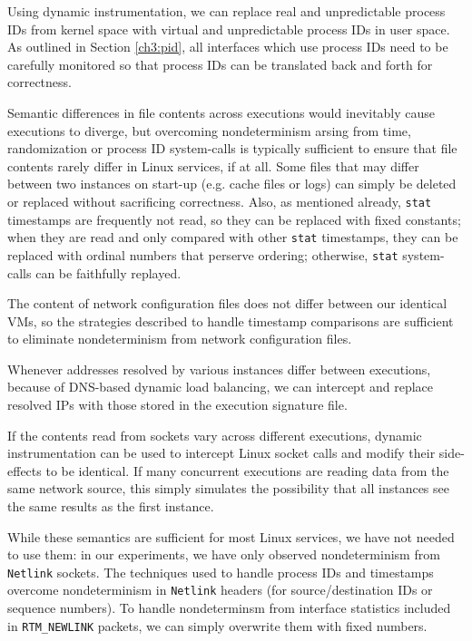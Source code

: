 Using dynamic instrumentation, we can replace
real and unpredictable process IDs from kernel space
with virtual and unpredictable process IDs in user space.
As outlined in Section \ref{ch3:pid}, all interfaces
which use process IDs need to be carefully monitored
so that process IDs can be translated back and forth
for correctness. \newline

 \newline
Semantic differences in file contents across
executions would inevitably cause executions
to diverge, but overcoming nondeterminism arsing
from time, randomization or process ID system-calls
is typically sufficient to ensure that
file contents rarely differ in Linux services,
if at all. Some files that may differ
between two instances on start-up (e.g. 
cache files or logs) can simply be 
deleted or replaced without sacrificing correctness.
Also, as mentioned already, \texttt{stat} 
timestamps are frequently not read, so
they can be replaced with fixed constants;
when they are read and only compared with other
\texttt{stat} timestamps, they can be replaced with 
ordinal numbers that perserve ordering;  
otherwise, \texttt{stat} system-calls 
can be faithfully replayed. \newline

 \newline
The content of network configuration files
does not differ between our identical VMs, so the strategies 
described to handle timestamp comparisons are sufficient
to eliminate nondeterminism from network configuration files.
 
Whenever addresses resolved by various instances differ
between executions, because of DNS-based dynamic load balancing, 
we can intercept and replace resolved IPs with those
stored in the execution signature file.

If the contents read from sockets vary across different executions,
dynamic instrumentation can be used to intercept Linux socket calls
and modify their side-effects to be identical. If
many concurrent executions are reading data from the
same network source, this simply simulates the possibility that all instances
see the same results as the first instance. 

While these semantics are sufficient for most Linux services,
we have not needed to use them: in our experiments,
we have only observed nondeterminism from \texttt{Netlink}
sockets. The techniques used to handle
process IDs and timestamps overcome nondeterminism
in \texttt{Netlink} headers (for source/destination IDs
or sequence numbers). To handle
nondeterminsm from interface statistics
included in \texttt{RTM\_NEWLINK} packets,
we can simply overwrite them with fixed
numbers. 

